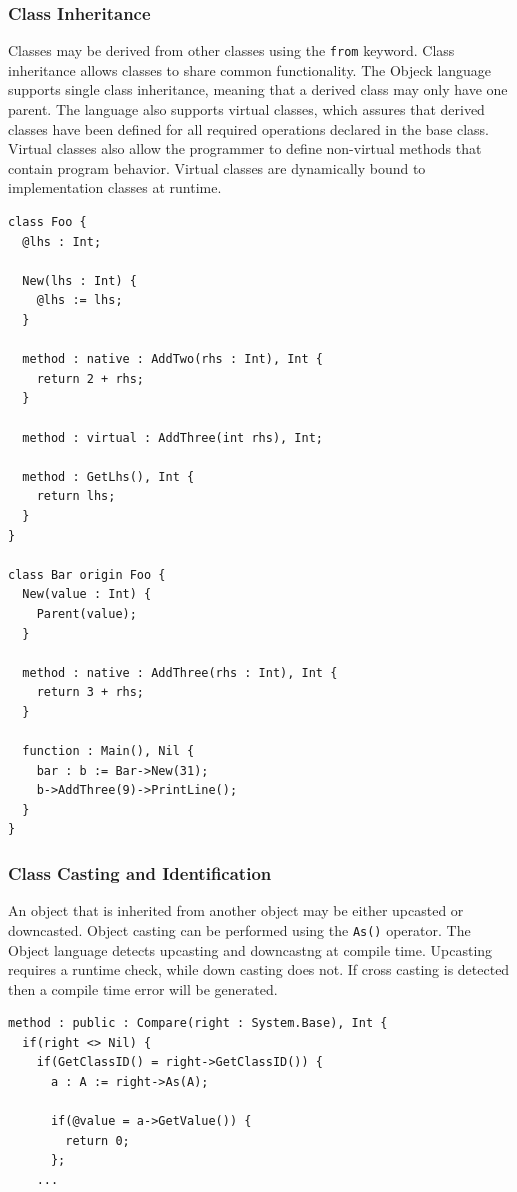 \documentclass[12pt]{article}
\begin{document}
\subsubsection{Class Inheritance}
Classes may be derived from other classes using the \texttt{from} keyword.  Class inheritance allows classes to share common functionality.  The Objeck language supports single class inheritance, meaning that a derived class may only have one parent.  The language also supports virtual classes, which assures that derived classes have been defined for all required operations declared in the base class.  Virtual classes also allow the programmer to define non-virtual methods that contain program behavior.  Virtual classes are dynamically bound to implementation classes at runtime.
\begin{verbatim}
class Foo {
  @lhs : Int;

  New(lhs : Int) {
    @lhs := lhs;
  }

  method : native : AddTwo(rhs : Int), Int {
    return 2 + rhs;
  }

  method : virtual : AddThree(int rhs), Int;

  method : GetLhs(), Int {
    return lhs;
  }
}

class Bar origin Foo {
  New(value : Int) {
    Parent(value);
  }

  method : native : AddThree(rhs : Int), Int {
    return 3 + rhs;
  }

  function : Main(), Nil {
    bar : b := Bar->New(31);
    b->AddThree(9)->PrintLine();
  }
}
\end{verbatim}

\subsubsection{Class Casting and Identification}
An object that is inherited from another object may be either upcasted or downcasted.  Object casting can be performed using the \texttt{As()} operator.  The Object language detects upcasting and downcastng at compile time. Upcasting requires a runtime check, while down casting does not. If cross casting is detected then a compile time error will be generated.

\begin{verbatim}
method : public : Compare(right : System.Base), Int {
  if(right <> Nil) {
    if(GetClassID() = right->GetClassID()) {
      a : A := right->As(A);

      if(@value = a->GetValue()) {
        return 0;
      };
    ...	
\end{verbatim}
\end{document}
